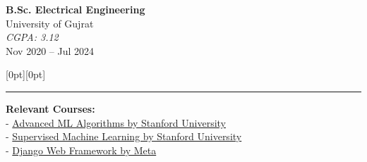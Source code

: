 \vspace{5pt}

\noindent
\begin{minipage}[t]{0.35\textwidth}  %
    \textbf{B.Sc. Electrical Engineering} \\ 
    University of Gujrat \\ 
    \textit{CGPA: 3.12} \\ 
    Nov 2020 -- Jul 2024 \\
\end{minipage}%
\hfill
\raisebox{-35pt}[0pt][0pt]{\rule{0.5pt}{40pt}}  %
\hfill
\begin{minipage}[t]{0.60\textwidth}  %
    \hspace{0.7cm}  %
    \textbf{Relevant Courses:} \\
    - \href{https://coursera.org/verify/77RVYNKUEB2H}{Advanced ML Algorithms by Stanford University} \\ 
    - \href{https://coursera.org/verify/LVY4KJZ9FVPG}{Supervised Machine Learning by Stanford University} \\ 
    - \href{https://coursera.org/verify/Q88RDF34VIYS}{Django Web Framework by Meta } \\
\end{minipage}
